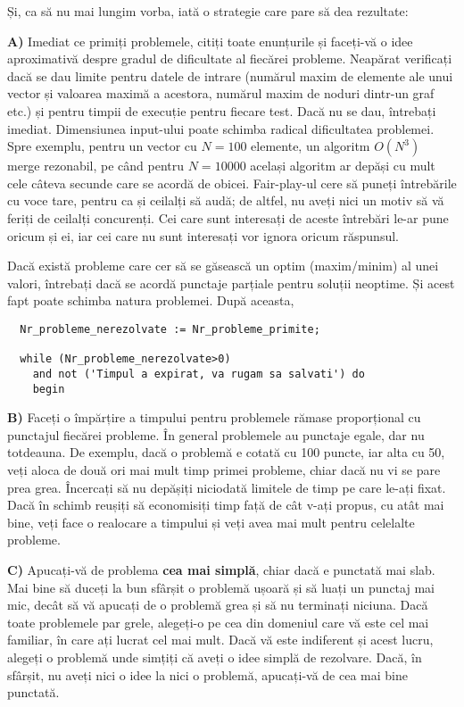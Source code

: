 Și, ca să nu mai lungim vorba, iată o strategie care pare să dea rezultate:

{\bf A)} Imediat ce primiți problemele, citiți toate enunțurile și faceți-vă o
idee aproximativă despre gradul de dificultate al fiecărei probleme. Neapărat
verificați dacă se dau limite pentru datele de intrare (numărul maxim de
elemente ale unui vector și valoarea maximă a acestora, numărul maxim de
noduri dintr-un graf etc.) și pentru timpii de execuție pentru fiecare
test. Dacă nu se dau, întrebați imediat. Dimensiunea input-ului poate schimba
radical dificultatea problemei. Spre exemplu, pentru un vector cu $N=100$
elemente, un algoritm $O(N^{3})$ merge rezonabil, pe când pentru $N=10000$
același algoritm ar depăși cu mult cele câteva secunde care se acordă de
obicei. Fair-play-ul cere să puneți întrebările cu voce tare, pentru ca și
ceilalți să audă; de altfel, nu aveți nici un motiv să vă feriți de ceilalți
concurenți. Cei care sunt interesați de aceste întrebări le-ar pune oricum și
ei, iar cei care nu sunt interesați vor ignora oricum răspunsul.

Dacă există probleme care cer să se găsească un optim (maxim/minim) al unei
valori, întrebați dacă se acordă punctaje parțiale pentru soluții neoptime. Și
acest fapt poate schimba natura problemei. După aceasta,

\begin{verbatim}
  Nr_probleme_nerezolvate := Nr_probleme_primite;

  while (Nr_probleme_nerezolvate>0) 
    and not ('Timpul a expirat, va rugam sa salvati') do
    begin
\end{verbatim}

{\bf B)} Faceți o împărțire a timpului pentru problemele rămase proporțional
cu punctajul fiecărei probleme. În general problemele au punctaje egale, dar
nu totdeauna. De exemplu, dacă o problemă e cotată cu 100 puncte, iar alta cu
50, veți aloca de două ori mai mult timp primei probleme, chiar dacă nu vi se
pare prea grea. Încercați să nu depășiți niciodată limitele de timp pe care
le-ați fixat. Dacă în schimb reușiți să economisiți timp față de cât v-ați
propus, cu atât mai bine, veți face o realocare a timpului și veți avea mai
mult pentru celelalte probleme.

{\bf C)} Apucați-vă de problema {\bf cea mai simplă}, chiar dacă e punctată
mai slab. Mai bine să duceți la bun sfârșit o problemă ușoară și să luați un
punctaj mai mic, decât să vă apucați de o problemă grea și să nu terminați
niciuna. Dacă toate problemele par grele, alegeți-o pe cea din domeniul care
vă este cel mai familiar, în care ați lucrat cel mai mult. Dacă vă este
indiferent și acest lucru, alegeți o problemă unde simțiți că aveți o idee
simplă de rezolvare. Dacă, în sfârșit, nu aveți nici o idee la nici o
problemă, apucați-vă de cea mai bine punctată.

